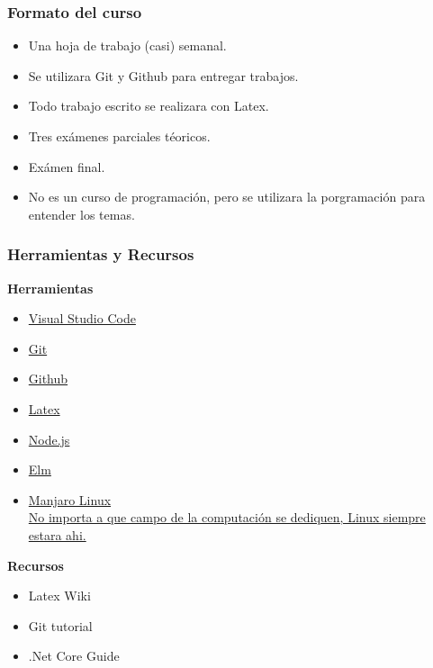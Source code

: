 \documentclass{beamer}
\begin{document}
\begin{frame}
    \frametitle{Formato del curso}
    \begin{itemize}
        \item{Una hoja de trabajo (casi) semanal.}
        \item{Se utilizara Git y Github para entregar trabajos.}
        \item{Todo trabajo escrito se realizara con Latex.}
        \item{Tres ex\'amenes parciales t\'eoricos.}
        \item{Ex\'amen final.}
        \item{No es un curso de programaci\'on, pero
        se utilizara la porgramaci\'on para entender los temas.}
    \end{itemize}
\end{frame}

\begin{frame}
\frametitle{Herramientas y Recursos}
\begin{multicols*}{2}
    {\bf Herramientas} \\
\begin{itemize}
    \item \href{https://code.visualstudio.com/}{Visual Studio Code}
    \item \href{https://git-scm.com/}{Git}
    \item \href{https://github.com/}{Github}
    \item \href{https://www.latex-project.org/}{Latex}
    \item \href{https://nodejs.org/en/}{Node.js}
    \item \href{http://elm-lang.org/}{Elm}
    \item \href{https://manjaro.org/}{Manjaro Linux\\
    \tiny{No importa a que campo de la computaci\'on se dediquen,
        Linux siempre estara ahi.}}
\end{itemize}
\columnbreak
{\bf Recursos}
\begin{itemize}
    \item Latex Wiki \cite{Latex}
    \item Git tutorial \cite{GitTutorial}
    \item .Net Core Guide \cite{DotNetGuide}
\end{itemize}
\end{multicols*}
\end{frame}
\end{document}

